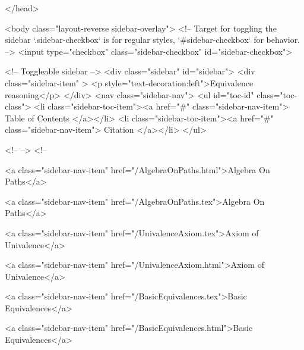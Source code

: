 </head>


  <body class="layout-reverse sidebar-overlay">
    <!-- Target for toggling the sidebar `.sidebar-checkbox` is for regular
     styles, `#sidebar-checkbox` for behavior. -->
<input type="checkbox" class="sidebar-checkbox" id="sidebar-checkbox">

<!-- Toggleable sidebar -->
<div class="sidebar" id="sidebar">
  <div class="sidebar-item" >
    <p style="text-decoration:left">Equivalence reasoning</p>
  </div>
  <nav class="sidebar-nav">
    <ul id="toc-id" class="toc-class">
  <li class="sidebar-toc-item"><a href="#" class="sidebar-nav-item"> Table of Contents </a></li>
  <li class="sidebar-toc-item"><a href="#" class="sidebar-nav-item"> Citation </a></li>
</ul>


    <!--  -->
    <!-- 
      
    
      
    
      
    
      
    
      
        
      
    
      
        
          <a class="sidebar-nav-item" href="/AlgebraOnPaths.html">Algebra On Paths</a>
        
      
    
      
        
          <a class="sidebar-nav-item" href="/AlgebraOnPaths.tex">Algebra On Paths</a>
        
      
    
      
        
          <a class="sidebar-nav-item" href="/UnivalenceAxiom.tex">Axiom of Univalence</a>
        
      
    
      
        
          <a class="sidebar-nav-item" href="/UnivalenceAxiom.html">Axiom of Univalence</a>
        
      
    
      
        
          <a class="sidebar-nav-item" href="/BasicEquivalences.tex">Basic Equivalences</a>
        
      
    
      
        
          <a class="sidebar-nav-item" href="/BasicEquivalences.html">Basic Equivalences</a>
        
      
    
